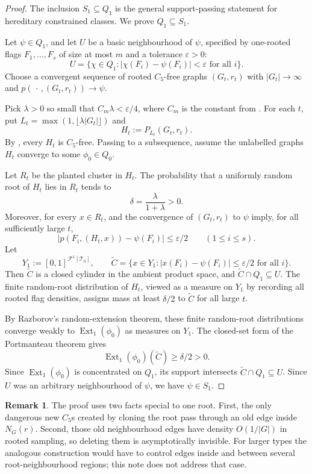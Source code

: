 \documentclass[11pt]{article}
\theoremstyle{definition}
\newtheorem{remark}[theorem]{Remark}
\newcommand{\F}{\mathcal F}
\newcommand{\T}{\mathcal T}
\newcommand{\Ext}{\operatorname{Ext}}
\begin{document}
\begin{proof}
The inclusion $S_1\subseteq Q_1$ is the general support-passing statement for
hereditary constrained classes.  We prove $Q_1\subseteq S_1$.

Let $\psi\in Q_1$, and let $U$ be a basic neighbourhood of $\psi$, specified by
one-rooted flags $F_1,\ldots,F_s$ of size at most $m$ and a tolerance
$\varepsilon>0$:
\[
  U=
  \{\chi\in Q_1:
    |\chi(F_i)-\psi(F_i)|<\varepsilon\text{ for all }i\}.
\]
Choose a convergent sequence of rooted $C_5$-free graphs
$(G_t,r_t)$ with $|G_t|\to\infty$ and
$p(\,\cdot\,,(G_t,r_t))\to\psi$.

Pick $\lambda>0$ so small that $C_m\lambda<\varepsilon/4$, where
$C_m$ is the constant from .  For each $t$, put
$L_t=\max(1,\lfloor\lambda |G_t|\rfloor)$ and
\[
  H_t:=P_{L_t}(G_t,r_t).
\]
By , every $H_t$ is $C_5$-free.  Passing to a
subsequence, assume the unlabelled graphs $H_t$ converge to some
$\phi_0\in Q_0$.

Let $R_t$ be the planted cluster in $H_t$.  The probability that a uniformly
random root of $H_t$ lies in $R_t$ tends to
\[
  \delta=\frac{\lambda}{1+\lambda}>0.
\]
Moreover, for every $x\in R_t$,  and the convergence
of $(G_t,r_t)$ to $\psi$ imply, for all sufficiently large $t$,
\[
  |p(F_i,(H_t,x))-\psi(F_i)|\le\varepsilon/2
  \qquad(1\le i\le s).
\]
Let
\[
  Y_1:=[0,1]^{\F^{1}[\T_0]},
  \qquad
  \widetilde C=
  \{x\in Y_1:
    |x(F_i)-\psi(F_i)|\le\varepsilon/2\text{ for all }i\}.
\]
Then $\widetilde C$ is a closed cylinder in the ambient product space, and
$\widetilde C\cap Q_1\subseteq U$.  The finite random-root distribution of
$H_t$, viewed as a measure on $Y_1$ by recording all rooted flag densities,
assigns mass at least $\delta/2$ to $\widetilde C$ for all large $t$.

By Razborov's random-extension theorem, these finite random-root distributions
converge weakly to $\Ext_1(\phi_0)$ as measures on $Y_1$.  The closed-set form
of the Portmanteau theorem gives
\[
  \Ext_1(\phi_0)(\widetilde C)\ge\delta/2>0.
\]
Since $\Ext_1(\phi_0)$ is concentrated on $Q_1$, its support intersects
$\widetilde C\cap Q_1\subseteq U$.  Since $U$ was an arbitrary neighbourhood
of $\psi$, we have $\psi\in S_1$.
\end{proof}

\begin{remark}
The proof uses two facts special to one root.  First, the only dangerous new
$C_5$s created by cloning the root pass through an old edge inside $N_G(r)$.
Second, those old neighbourhood edges have density $O(1/|G|)$ in rooted
sampling, so deleting them is asymptotically invisible.  For larger types the
analogous construction would have to control edges inside and between several
root-neighbourhood regions; this note does not address that case.
\end{remark}
\end{document}
